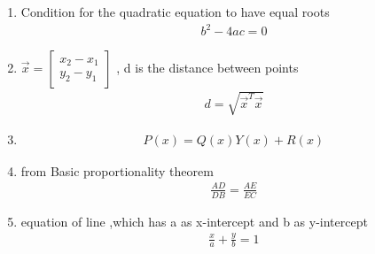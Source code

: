 \begin{enumerate}[label=\thesubsection.\arabic*, ref=\thesubsection.\theenumi]
	\item Condition for the quadratic equation to have equal roots
	\begin{align}
		b^2 -4ac =0 \label{eq:EE26BTECH11222-prob 1}
	\end{align}
	
	
	\item
	 $\vec{x} =\begin{bmatrix}
	 	x_2 - x_1 \\
	 	y_2 - y_1
	 	\end{bmatrix}$ , d is the distance between points
	\begin{align} 
		d=\sqrt{\vec{x}^T\vec{x}}\label{eq:EE26BTECH11222-prob 4}
	\end{align}
	
	\item 
	\begin{align}
		P(x)=Q(x)Y(x)+R(x) \label{eq:ee26btech11222-prob 6}
	\end{align}
	
	\item from Basic proportionality theorem
	\begin{align}
		\frac{AD}{DB}=\frac{AE}{EC} \label{eq:ee26btech11222-prob_10 7}
	\end{align}
	
	\item equation of line ,which has a as x-intercept and b as y-intercept
	\begin{align}
		\frac{x}{a} +\frac{y}{b}=1
	\end{align}
	
\end{enumerate}
